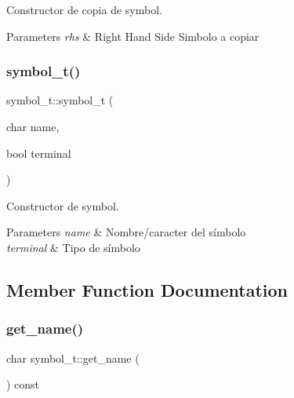 Constructor de copia de symbol. 


\begin{DoxyParams}{Parameters}
{\em rhs} & Right Hand Side Simbolo a copiar \\
\hline
\end{DoxyParams}
\mbox{\label{classsymbol__t_ad9304527975819991abbf747c3147ccc}} 
\subsubsection{\texorpdfstring{symbol\+\_\+t()}{symbol\_t()}\hspace{0.1cm}{\footnotesize\ttfamily [2/2]}}
{\footnotesize\ttfamily symbol\+\_\+t\+::symbol\+\_\+t (\begin{DoxyParamCaption}\item[{char}]{name,  }\item[{bool}]{terminal }\end{DoxyParamCaption})\hspace{0.3cm}{\ttfamily [inline]}}



Constructor de symbol. 


\begin{DoxyParams}{Parameters}
{\em name} & Nombre/caracter del símbolo \\
\hline
{\em terminal} & Tipo de símbolo \\
\hline
\end{DoxyParams}


\subsection{Member Function Documentation}
\mbox{\label{classsymbol__t_a9b7b7463f33db34861590701a23a78bc}} 
\subsubsection{\texorpdfstring{get\+\_\+name()}{get\_name()}}
{\footnotesize\ttfamily char symbol\+\_\+t\+::get\+\_\+name (\begin{DoxyParamCaption}{ }\end{DoxyParamCaption}) const\hspace{0.3cm}{\ttfamily [inline]}}



